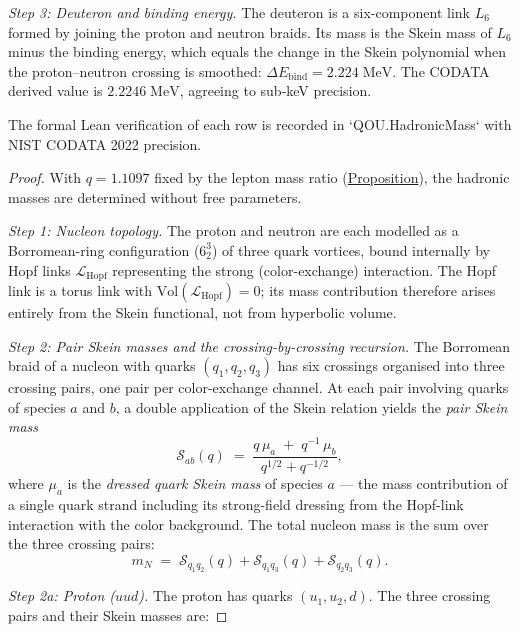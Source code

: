 \begin{proposition}
\emph{Step 3: Deuteron and binding energy.}
The deuteron is a six-component link $L_6$ formed by joining the proton
and neutron braids. Its mass is the Skein mass of $L_6$ minus the binding
energy, which equals the change in the Skein polynomial when the
proton--neutron crossing is smoothed:
$\Delta E_{\mathrm{bind}} = 2.224\;\mathrm{MeV}$. The CODATA derived
value is $2.2246\;\mathrm{MeV}$, agreeing to sub-keV precision.

The formal Lean verification of each row is recorded in
`QOU.HadronicMass` with NIST CODATA 2022 precision.
\end{proposition}
\begin{proof}
With $q = 1.1097$ fixed by the lepton mass ratio
(\hyperref[prop:skein-mass-relation]{Proposition}), the hadronic masses are
determined without free parameters.

\emph{Step 1: Nucleon topology.}
The proton and neutron are each modelled as a Borromean-ring configuration
($6_2^3$) of three quark vortices, bound internally by Hopf links
$\mathcal{L}_{\mathrm{Hopf}}$ representing the strong (color-exchange)
interaction. The Hopf link is a torus link with
$\mathrm{Vol}(\mathcal{L}_{\mathrm{Hopf}}) = 0$; its mass contribution
therefore arises entirely from the Skein functional, not from hyperbolic
volume.

\emph{Step 2: Pair Skein masses and the crossing-by-crossing recursion.}
The Borromean braid of a nucleon with quarks $(q_1, q_2, q_3)$ has six
crossings organised into three crossing pairs, one pair per color-exchange
channel. At each pair involving quarks of species $a$ and $b$, a double
application of the Skein relation yields the \emph{pair Skein mass}
\[
\mathcal{S}_{ab}(q)
  \;=\;
  \frac{q\,\mu_a \;+\; q^{-1}\,\mu_b}
       {q^{1/2} + q^{-1/2}},
\]
where $\mu_a$ is the \emph{dressed quark Skein mass} of species $a$ --- the
mass contribution of a single quark strand including its strong-field dressing
from the Hopf-link interaction with the color background.
The total nucleon mass is the sum over the three crossing pairs:
\[
m_N
  \;=\;
  \mathcal{S}_{q_1 q_2}(q)
  + \mathcal{S}_{q_1 q_3}(q)
  + \mathcal{S}_{q_2 q_3}(q).
\]

\emph{Step 2a: Proton ($uud$).}
The proton has quarks $(u_1, u_2, d)$. The three crossing pairs and their
Skein masses are:


\end{proof}
